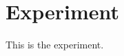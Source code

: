 \graphicspath{{main-matter/experiment/resources/}}

\chapter{Experiment}\label{chap_exper}

This is the experiment.
